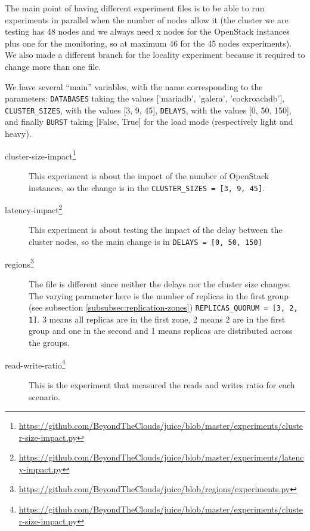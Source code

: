 The main point of having different experiment files is to be able to run experiments in parallel when the number of nodes allow it (the cluster we are testing has 48 nodes and we always need x nodes for the OpenStack instances plus one for the monitoring, so at maximum 46 for the 45 nodes experiments). We also made a different branch for the locality experiment because it required to change more than one file.

We have several ``main'' variables, with the name corresponding to the parameters: \verb+DATABASES+ taking the values ['mariadb', 'galera', 'cockroachdb'], \verb+CLUSTER_SIZES+, with the values [3, 9, 45], \verb+DELAYS+, with the values [0, 50, 150], and finally \verb+BURST+ taking [False, True] for the load mode (respectively light and heavy).

\begin{description}
\item[cluster-size-impact\footnote{\url{https://github.com/BeyondTheClouds/juice/blob/master/experiments/cluster-size-impact.py}}] This experiment is about the impact of the number of OpenStack instances, so the change is in the \verb+CLUSTER_SIZES = [3, 9, 45]+.
  \item[latency-impact\footnote{\url{https://github.com/BeyondTheClouds/juice/blob/master/experiments/latency-impact.py}}] This experiment is about testing the impact of the delay between the cluster nodes, so the main change is in \verb+DELAYS = [0, 50, 150]+
\item[regions\footnote{\url{https://github.com/BeyondTheClouds/juice/blob/regions/experiments.py}}] The file is different since neither the delays nor the cluster size changes. The varying parameter here is the number of replicas in the first group (see subsection \ref{subsubsec:replication-zones}) \verb+REPLICAS_QUORUM = [3, 2, 1]+. 3 means all replicas are in the first zone, 2 means 2 are in the first group and one in the second and 1 means replicas are distributed across the groups.
  \item[read-write-ratio\footnote{\url{https://github.com/BeyondTheClouds/juice/blob/master/experiments/cluster-size-impact.py}}] This is the experiment that measured the reads and writes ratio for each scenario.
\end{description}
